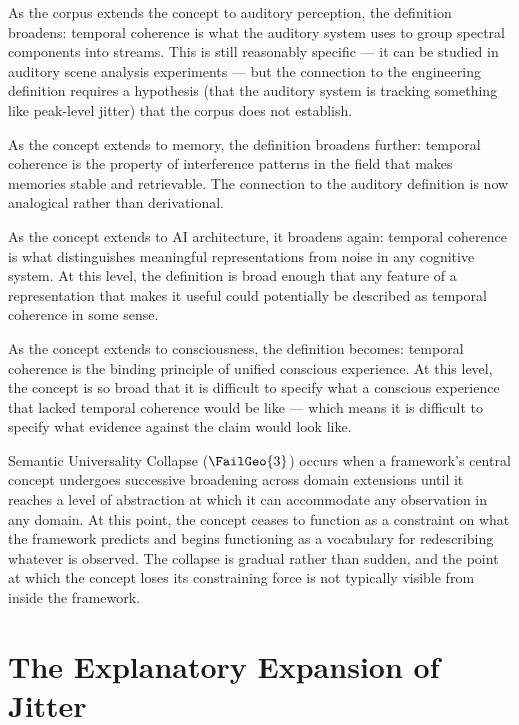 As the corpus extends the concept to auditory perception,
the definition broadens: temporal coherence is what the
auditory system uses to group spectral components into
streams. This is still reasonably specific --- it can be
studied in auditory scene analysis experiments --- but
the connection to the engineering definition requires a
hypothesis (that the auditory system is tracking something
like peak-level jitter) that the corpus does not establish.

As the concept extends to memory, the definition broadens
further: temporal coherence is the property of interference
patterns in the \MEMeight{} field that makes memories stable
and retrievable. The connection to the auditory definition
is now analogical rather than derivational.

As the concept extends to AI architecture, it broadens
again: temporal coherence is what distinguishes meaningful
representations from noise in any cognitive system. At
this level, the definition is broad enough that any feature
of a representation that makes it useful could potentially
be described as temporal coherence in some sense.

As the concept extends to consciousness, the definition
becomes: temporal coherence is the binding principle of
unified conscious experience. At this level, the concept
is so broad that it is difficult to specify what a
conscious experience that lacked temporal coherence would
be like --- which means it is difficult to specify what
evidence against the claim would look like.

\begin{auditprop}
\label{ap:semantic-universality}
Semantic Universality Collapse ($\FailGeo{3}$) occurs when
a framework's central concept undergoes successive broadening
across domain extensions until it reaches a level of
abstraction at which it can accommodate any observation
in any domain. At this point, the concept ceases to function
as a constraint on what the framework predicts and begins
functioning as a vocabulary for redescribing whatever is
observed. The collapse is gradual rather than sudden,
and the point at which the concept loses its constraining
force is not typically visible from inside the framework.
\end{auditprop}

\section{The Explanatory Expansion of Jitter}
\label{sec:jitter-expansion}

